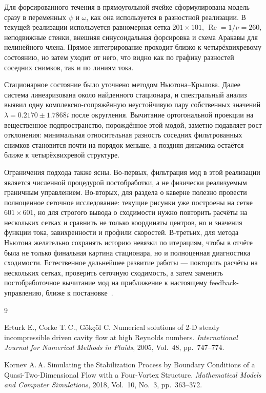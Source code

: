\documentclass[12pt,a4paper]{article}
\newcommand{\Reynolds}{\operatorname{Re}}
\begin{document}
Для форсированного течения в прямоугольной ячейке сформулирована модель сразу в переменных \(\psi\) и \(\omega\), как она используется в разностной реализации.
В текущей реализации используется равномерная сетка \(201\times101\), \(\Reynolds=1/\nu=260\), неподвижные стенки, внешняя синусоидальная форсировка и схема Аракавы для нелинейного члена.
Прямое интегрирование проходит близко к четырёхвихревому состоянию, но затем уходит от него, что видно как по графику разностей соседних снимков, так и по линиям тока.

Стационарное состояние было уточнено методом Ньютона--Крылова.
Далее система линеаризована около найденного стационара, и спектральный анализ выявил одну комплексно-сопряжённую неустойчивую пару собственных значений
\(\lambda=0.2170\pm1.7868i\) после округления.
Вычитание ортогональной проекции на вещественное подпространство, порождённое этой модой, заметно подавляет рост отклонения: минимальная относительная разность соседних фильтрованных снимков становится почти на порядок меньше, а поздняя динамика остаётся ближе к четырёхвихревой структуре.

Ограничения подхода также ясны.
Во-первых, фильтрация мод в этой реализации является численной процедурой постобработки, а не физически реализуемым граничным управлением.
Во-вторых, для раздела о каверне полезно провести полноценное сеточное исследование: текущие рисунки уже построены на сетке \(601\times601\), но для строгого вывода о сходимости нужно повторить расчёты на нескольких сетках и сравнить не только координаты центров, но и значения функции тока, завихренности и профили скоростей.
В-третьих, для метода Ньютона желательно сохранять историю невязки по итерациям, чтобы в отчёте была не только финальная картина стационара, но и полноценная диагностика сходимости.
Естественное дальнейшее развитие работы --- повторить расчёты на нескольких сетках, проверить сеточную сходимость, а затем заменить постобработочное вычитание мод на приближение к настоящему feedback-управлению, ближе к постановке~\cite{kornev2018}.

\begin{thebibliography}{9}

Erturk E., Corke T.\,C., G\"ok\c{c}\"ol C.
Numerical solutions of 2-D steady incompressible driven cavity flow at high Reynolds numbers.
\emph{International Journal for Numerical Methods in Fluids}, 2005, Vol.~48, pp.~747--774.

Kornev A.\,A.
Simulating the Stabilization Process by Boundary Conditions of a Quasi-Two-Dimensional Flow with a Four-Vortex Structure.
\emph{Mathematical Models and Computer Simulations}, 2018, Vol.~10, No.~3, pp.~363--372.

\end{thebibliography}
\end{document}
